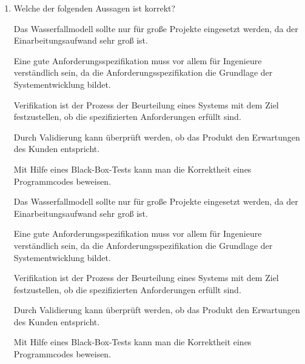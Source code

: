 \documentclass{bschlangaul-aufgabe}
\begin{document}
\begin{enumerate}
%

\item Welche der folgenden Aussagen ist korrekt?

\begin{itemize}
\bCheckboxLeer Das Wasserfallmodell sollte nur für große Projekte
eingesetzt werden, da der Einarbeitungsaufwand sehr groß ist.

\bCheckboxLeer Eine gute Anforderungsspezifikation muss vor allem für
Ingenieure verständlich sein,  da die Anforderungsspezifikation die
Grundlage der Systementwicklung bildet.

\bCheckboxLeer Verifikation ist der Prozess der Beurteilung eines
Systems mit dem Ziel festzustellen, ob die spezifizierten Anforderungen
erfüllt sind.

\bCheckboxLeer Durch Validierung kann überprüft werden, ob das Produkt
den Erwartungen des Kunden entspricht.

\bCheckboxLeer Mit Hilfe eines Black-Box-Tests kann man die Korrektheit
eines Programmcodes beweisen.
\end{itemize}

\begin{bAntwort}
\begin{itemize}
\bCheckboxLeer Das Wasserfallmodell sollte nur für große Projekte
eingesetzt werden, da der Einarbeitungsaufwand sehr groß ist.

\bCheckboxLeer Eine gute Anforderungsspezifikation muss vor allem für
Ingenieure verständlich sein,  da die Anforderungsspezifikation die
Grundlage der Systementwicklung bildet.

\bCheckboxLeer Verifikation ist der Prozess der Beurteilung eines
Systems mit dem Ziel festzustellen, ob die spezifizierten Anforderungen
erfüllt sind.

\bCheckboxAngekreuzt Durch Validierung kann überprüft werden, ob das
Produkt den Erwartungen des Kunden entspricht.

\bCheckboxLeer Mit Hilfe eines Black-Box-Tests kann man die Korrektheit
eines Programmcodes beweisen.
\end{itemize}
\end{bAntwort}
\end{enumerate}
\end{document}
